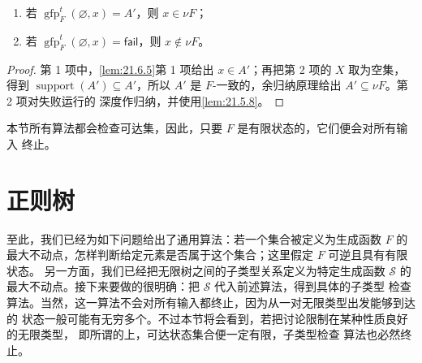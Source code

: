 \taplstatementliststart
\begin{theorem}
\label{thm:21.6.6}
\taplstatementlistbreak
\begin{enumerate}
  \item 若 \(\operatorname{gfp}_F^t(\varnothing,x)=A'\)，则 \(x\in\nu F\)；
  \item 若 \(\operatorname{gfp}_F^t(\varnothing,x)=\mathsf{fail}\)，则
        \(x\notin\nu F\)。
\end{enumerate}
\end{theorem}

\begin{proof}
第 1 项中，\cref{lem:21.6.5}第 1 项给出 \(x\in A'\)；再把第 2 项的
\(X\) 取为空集，得到
\(\operatorname{support}(A')\subseteq A'\)，所以 \(A'\) 是
\(F\)-一致的，余归纳原理给出 \(A'\subseteq\nu F\)。第 2 项对失败运行的
深度作归纳，并使用\cref{lem:21.5.8}。
\end{proof}


本节所有算法都会检查可达集，因此，只要 \(F\) 是有限状态的，它们便会对所有输入
终止。

\section{正则树}
\label{sec:21.7}

至此，我们已经为如下问题给出了通用算法：若一个集合被定义为生成函数 \(F\) 的
最大不动点，怎样判断给定元素是否属于这个集合；这里假定 \(F\) 可逆且具有有限状态。
另一方面，我们已经把无限树之间的子类型关系定义为特定生成函数 \(\mathcal S\) 的
最大不动点。接下来要做的很明确：把 \(\mathcal S\) 代入前述算法，得到具体的子类型
检查算法。当然，这一算法不会对所有输入都终止，因为从一对无限类型出发能够到达的
状态一般可能有无穷多个。不过本节将会看到，若把讨论限制在某种性质良好的无限类型，
即所谓的上，可达状态集合便一定有限，子类型检查
算法也必然终止。

